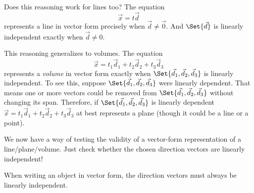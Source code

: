 Does this reasoning work for lines too? The equation
\[
	\vec x=t\vec d
\]
represents a line in vector form precisely when $\vec d\neq \vec 0$. And $\Set{\vec d}$ is linearly independent
exactly when $\vec d\neq 0$.

This reasoning generalizes to volumes. The equation
\[
	\vec x=t_1\vec d_1+t_2\vec d_2+t_3\vec d_3
\]
represents a \emph{volume} in vector form exactly when $\Set{\vec d_1,\vec d_2,\vec d_3}$ is linearly independent.
To see this, suppose $\Set{\vec d_1,\vec d_2,\vec d_3}$ were linearly dependent. That means one or
more vectors could be removed from $ \Set{\vec d_1,\vec d_2,\vec d_3}$ without changing its span.
Therefore, if $\Set{\vec d_1,\vec d_2,\vec d_3}$ is linearly dependent $\vec x=t_1\vec d_1+t_2\vec d_2+t_3\vec d_3$
at best represents a plane (though it could be a line or a point).

We now have a way of testing the validity of a vector-form representation of a line/plane/volume. Just check
whether the chosen direction vectors are linearly independent!
\begin{emphbox}[Takeaway]
	When writing an object in vector form, the direction vectors must always be linearly independent.
\end{emphbox}
